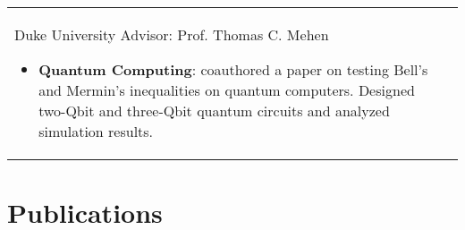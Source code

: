 \documentclass[10pt]{article} %
\begin{document}
\begin{longtable}{L{4cm}@{\hskip 0.15in}L{13.5cm}}
{\normalsize Duke University} %
{Advisor: Prof. Thomas C. Mehen} %
{\begin{itemize}
\vspace{-0.4cm}
 \item \textbf{Quantum Computing}: coauthored a paper on testing  Bell's and Mermin's inequalities on quantum computers. Designed two-Qbit and three-Qbit quantum circuits and analyzed simulation results.
 \end{itemize}}  %


\end{longtable}

\vspace*{1mm} %


\section{Publications}


\end{document}
